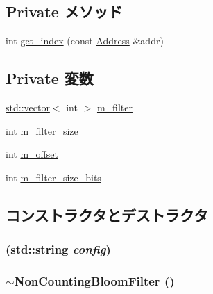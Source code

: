 \subsection*{Private メソッド}
\begin{DoxyCompactItemize}
\item 
int \hyperlink{classNonCountingBloomFilter_a0a9fd2f2f75033080fc27830f7c0fe64}{get\_\-index} (const \hyperlink{classAddress}{Address} \&addr)
\end{DoxyCompactItemize}
\subsection*{Private 変数}
\begin{DoxyCompactItemize}
\item 
\hyperlink{classstd_1_1vector}{std::vector}$<$ int $>$ \hyperlink{classNonCountingBloomFilter_aae3fd71ce4b5e8910aa63829ba6abd41}{m\_\-filter}
\item 
int \hyperlink{classNonCountingBloomFilter_af53abddc4707ab403450239a6e94c486}{m\_\-filter\_\-size}
\item 
int \hyperlink{classNonCountingBloomFilter_a95c7d2cff0db2569af32b11319035e5e}{m\_\-offset}
\item 
int \hyperlink{classNonCountingBloomFilter_a5c26703945ae76ff80ec6951cccea29c}{m\_\-filter\_\-size\_\-bits}
\end{DoxyCompactItemize}


\subsection{コンストラクタとデストラクタ}
\hypertarget{classNonCountingBloomFilter_a373173985101b10bc49bb32b18e82be7}{
\subsubsection[{NonCountingBloomFilter}]{ (std::string {\em config})}}
\label{classNonCountingBloomFilter_a373173985101b10bc49bb32b18e82be7}
\hypertarget{classNonCountingBloomFilter_aa35075e5fa499054bcac4cc5eebfb5e8}{
\subsubsection[{$\sim$NonCountingBloomFilter}]{\setlength{\rightskip}{0pt plus 5cm}$\sim${\bf NonCountingBloomFilter} ()}}
\label{classNonCountingBloomFilter_aa35075e5fa499054bcac4cc5eebfb5e8}



